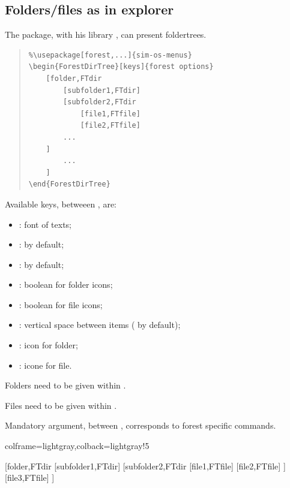 \documentclass[11pt,a4paper]{ltxdoc}
\begin{document}
\pagebreak

\subsection{Folders/files as in explorer}

The  package, with his library , can present foldertrees.

\begin{quote}
\begin{verbatim}
%\usepackage[forest,...]{sim-os-menus}
\begin{ForestDirTree}[keys]{forest options}
    [folder,FTdir
        [subfolder1,FTdir]
        [subfolder2,FTdir
            [file1,FTfile]
            [file2,FTfile]
        ...
    ]
        ...
    ]
\end{ForestDirTree}
\end{verbatim}
\end{quote}

Available \textsf{keys}, betweeen \MontreCode{[...]}, are:

\begin{itemize}
	\item {}: font of texts;
	\item {}:  by default;
	\item {}:  by default;
	\item {}: boolean for folder icons;
	\item {}: boolean for file icons;
	\item {}: vertical space between items (\MontreCode{0.15em} by default);
	\item {}: icon for folder;
	\item {}: icone for file.
\end{itemize}

\medskip

\textsf{Folders} need to be given within .

\textsf{Files} need to be given within .

\medskip

Mandatory argument, between , corresponds to \textsf{forest} specific commands.

\begin{tcblisting}{colframe=lightgray,colback=lightgray!5}
\begin{ForestDirTree}{}
    [folder,FTdir
        [subfolder1,FTdir]
        [subfolder2,FTdir
            [file1,FTfile]
            [file2,FTfile]
        ]
        [file3,FTfile]
    ]
\end{ForestDirTree}
\end{tcblisting}
\end{document}
